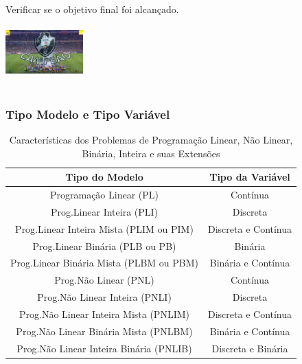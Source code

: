 \documentclass{beamer}
\begin{document}
\begin{frame}
\begin{columns}
\begin{column}{0.3\textwidth}
{\begin{mdframed}[backgroundcolor=red!55]
				\end{mdframed}
			}		
			{
				\centering
				\begin{mdframed}[backgroundcolor=red!55] 
					\scriptsize
					Verificar se o objetivo final foi alcançado.
				\end{mdframed}
			}		
			{
				\centering
				\includegraphics[width=3cm,height=2cm]{vasco.jpg}
			}		
		\end{column}
	\end{columns}
\end{frame}

\begin{frame}
	\frametitle{Tipo Modelo e Tipo Variável}
	\begin{table}[]
		\centering
		\caption{Características dos Problemas de Programação Linear, Não Linear, Binária, Inteira e suas Extensões}
		\scriptsize
		\begin{tabular}{| c | c | }
			\hline
			\hline
			\cellcolor{red!55}Tipo do Modelo  	     & \cellcolor{red!55}Tipo da Variável \\
			\hline
			\hline
			\cellcolor{green!25}Programação Linear (PL) 			   & \cellcolor{green!25}Contínua 	        \\
			\hline
			\cellcolor{cyan!25}Prog.Linear Inteira (PLI) 			   & \cellcolor{cyan!25}Discreta  		    \\
			\hline
			\cellcolor{green!25}Prog.Linear Inteira Mista (PLIM ou PIM)& \cellcolor{green!25}Discreta e Contínua\\
			\hline
			\cellcolor{cyan!25}Prog.Linear Binária (PLB ou PB) 		   & \cellcolor{cyan!25}Binária   	        \\
			\hline
			\cellcolor{green!25}Prog.Linear Binária Mista (PLBM ou PBM)& \cellcolor{green!25}Binária e Contínua \\
			\hline
			\cellcolor{cyan!25}Prog.Não Linear (PNL)	 			   & \cellcolor{cyan!25}Contínua    		\\
			\hline
			\cellcolor{green!25}Prog.Não Linear Inteira (PNLI)  	   & \cellcolor{green!25}Discreta    		\\	
			\hline
			\cellcolor{cyan!25}Prog.Não Linear Inteira Mista (PNLIM)   & \cellcolor{cyan!25}Discreta e Contínua \\	
			\hline
			\cellcolor{green!25}Prog.Não Linear Binária Mista (PNLBM)  & \cellcolor{green!25}Binária e Contínua \\	
			\hline
			\cellcolor{cyan!25}Prog.Não Linear Inteira Binária (PNLIB) & \cellcolor{cyan!25}Discreta e Binária  \\	
			\hline
			\hline		
		\end{tabular}
	\end{table}		
\end{frame}
\end{document}
